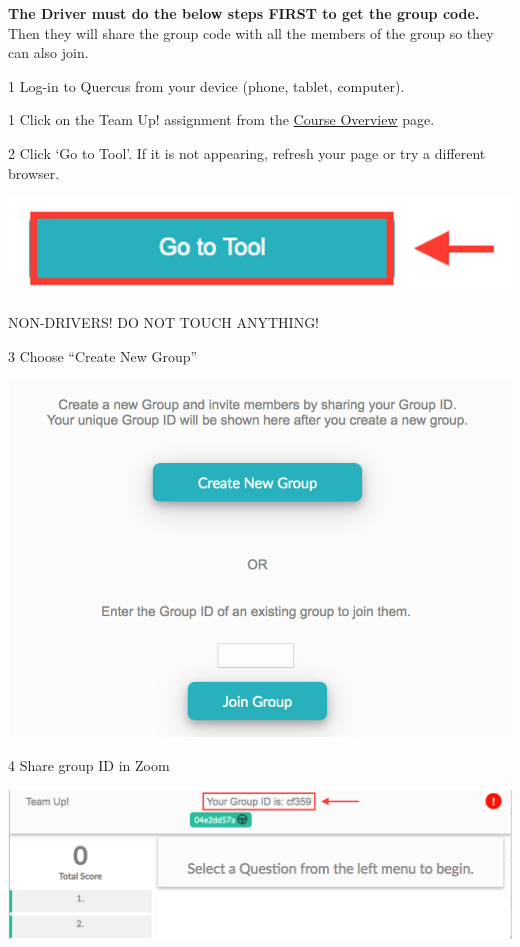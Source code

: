 \documentclass[
  openany]{book}
\begin{document}
\textbf{The Driver must do the below steps FIRST to get the group code.} Then they will share the group code with all the members of the group so they can also join.

1 Log-in to Quercus from your device (phone, tablet, computer).

1 Click on the Team Up! assignment from the \href{https://q.utoronto.ca/courses/253305/pages/course-overview}{Course Overview} page.

2 Click `Go to Tool'. If it is not appearing, refresh your page or try a different browser.

\begin{center}\includegraphics[width=0.5\linewidth]{images/course-tools/gototool} \end{center}

NON-DRIVERS! DO NOT TOUCH ANYTHING!

3 Choose ``Create New Group''

\begin{center}\includegraphics[width=1\linewidth]{images/course-tools/choose create} \end{center}

4 Share group ID in Zoom

\begin{center}\includegraphics[width=1\linewidth]{images/course-tools/group id} \end{center}
\end{document}

